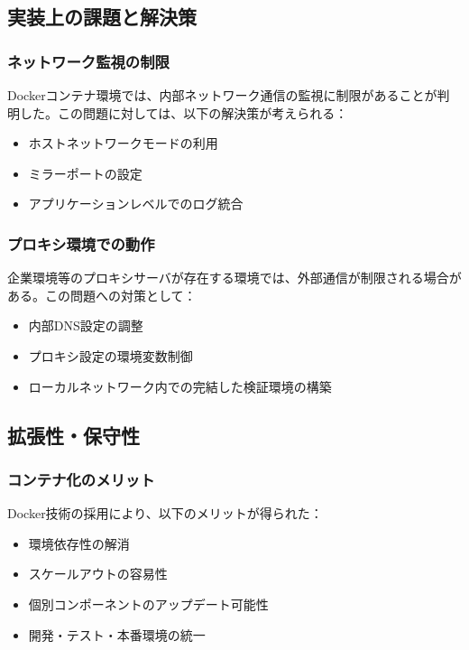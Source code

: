 \documentclass[12pt,a4paper]{article}
\begin{document}
\subsection{実装上の課題と解決策}

\subsubsection{ネットワーク監視の制限}
Dockerコンテナ環境では、内部ネットワーク通信の監視に制限があることが判明した。この問題に対しては、以下の解決策が考えられる：

\begin{itemize}
    \item ホストネットワークモードの利用
    \item ミラーポートの設定
    \item アプリケーションレベルでのログ統合
\end{itemize}

\subsubsection{プロキシ環境での動作}
企業環境等のプロキシサーバが存在する環境では、外部通信が制限される場合がある。この問題への対策として：

\begin{itemize}
    \item 内部DNS設定の調整
    \item プロキシ設定の環境変数制御
    \item ローカルネットワーク内での完結した検証環境の構築
\end{itemize}

\subsection{拡張性・保守性}

\subsubsection{コンテナ化のメリット}
Docker技術の採用により、以下のメリットが得られた：

\begin{itemize}
    \item 環境依存性の解消
    \item スケールアウトの容易性
    \item 個別コンポーネントのアップデート可能性
    \item 開発・テスト・本番環境の統一
\end{itemize}
\end{document}
